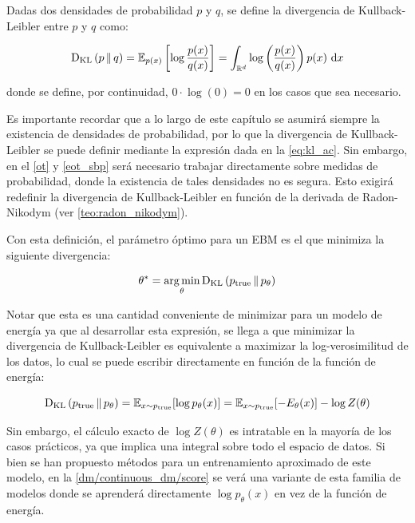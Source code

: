 \begin{defn}
    \label{defn:kl_ac}
    Dadas dos densidades de probabilidad $p$ y $q$, se define la divergencia de Kullback-Leibler entre $p$ y $q$ como:

    \begin{equation*}
        \label{eq:kl_ac}
        \operatorname{D_{KL}}\left(p\,\|\,q\right)
        = \mathbb{E}_{p(x)}\left[\log \frac{p(x)}{q(x)}\right]
        = \int_{\mathbb{R}^d} \log\left(\frac{p(x)}{q(x)}\right)p(x) \,\operatorname{d}\! x
    \end{equation*}

    donde se define, por continuidad, $0\cdot\log(0)=0$ en los casos que sea necesario.
\end{defn}

Es importante recordar que a lo largo de este capítulo se asumirá siempre la existencia de densidades de probabilidad, por lo que la divergencia de Kullback-Leibler se puede definir mediante la expresión dada en la \eqref{eq:kl_ac}. Sin embargo, en el \autoref{ot} y \autoref{eot_sbp} será necesario trabajar directamente sobre medidas de probabilidad, donde la existencia de tales densidades no es segura. Esto exigirá redefinir la divergencia de Kullback-Leibler en función de la derivada de Radon-Nikodym (ver \autoref{teo:radon_nikodym}).

Con esta definición, el parámetro óptimo para un EBM es el que minimiza la siguiente divergencia:

\begin{equation*}
    \theta^* = \operatorname*{arg\,min}_\theta \operatorname{D_{KL}}\left(p_{\text{true}}\,\|\,p_\theta\right)
\end{equation*}

Notar que esta es una cantidad conveniente de minimizar para un modelo de energía ya que al desarrollar esta expresión, se llega a que minimizar la divergencia de Kullback-Leibler es equivalente a maximizar la log-verosimilitud de los datos, lo cual se puede escribir directamente en función de la función de energía:

\begin{equation*}
    \operatorname{D_{KL}}\left(p_{\text{true}}\,\|\,p_\theta\right) = \mathbb{E}_{x \sim p_{\text{true}}}[\log p_\theta(x)] = \mathbb{E}_{x \sim p_{\text{true}}}[-E_\theta(x)] - \log Z(\theta)
\end{equation*}

Sin embargo, el cálculo exacto de $\log Z(\theta)$ es intratable en la mayoría de los casos prácticos, ya que implica una integral sobre todo el espacio de datos. Si bien se han propuesto métodos para un entrenamiento aproximado de este modelo, en la \autoref{dm/continuous_dm/score} se verá una variante de esta familia de modelos donde se aprenderá directamente $\log p_\theta(x)$ en vez de la función de energía.


